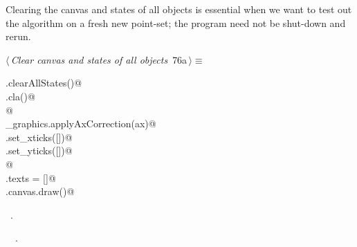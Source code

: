 \documentclass[11.5pt]{report}
\begin{document}

\vspace{-0.8cm}\newchunk Clearing the canvas and states of all objects is essential when we want to test out the algorithm on a fresh
new point-set; the program need not be shut-down and rerun. 
\begin{flushleft} \small\label{scrap107}\raggedright\small
{} $\langle\,${\itshape Clear canvas and states of all objects}\nobreak\ {\footnotesize {76a}}$\,\rangle\equiv$
\vspace{-1ex}
\begin{list}{}{} \item
\mbox{}\verb@run.clearAllStates()@\\
\mbox{}\verb@ax.cla()@\\
\mbox{}\verb@              @\\
\mbox{}\verb@utils_graphics.applyAxCorrection(ax)@\\
\mbox{}\verb@ax.set_xticks([])@\\
\mbox{}\verb@ax.set_yticks([])@\\
\mbox{}\verb@                 @\\
\mbox{}\verb@fig.texts = []@\\
\mbox{}\verb@fig.canvas.draw()@\\
\mbox{}\verb@@{\NWsep}
\end{list}
\vspace{-1.5ex}
\footnotesize
\begin{list}{}{\setlength{\itemsep}{-\parsep}\setlength{\itemindent}{-\leftmargin}}
\item \NWtxtMacroRefIn\ .
\item \NWtxtIdentsUsed\nobreak\  \verb@clearAllStates@\nobreak\ .
\item{}
\end{list}
\vspace{4ex}
\end{flushleft}
\end{document}
